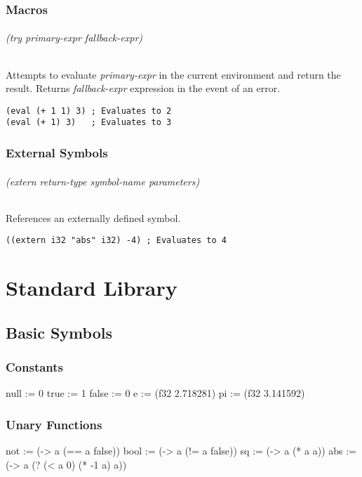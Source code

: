 \documentclass[numbers=noenddot]{scrbook}
\newenvironment{likely}
{ \verbatim }
{ \endverbatim }
\begin{document}
\section{Macros}
\paragraph{(try \emph{primary-expr} \emph{fallback-expr})}
Attempts to evaluate \emph{primary-expr} in the current environment and return the result.
Returns \emph{fallback-expr} expression in the event of an error.

\begin{verbatim}
(eval (+ 1 1) 3) ; Evaluates to 2
(eval (+ 1) 3)   ; Evaluates to 3
\end{verbatim}

\section{External Symbols}
\paragraph{(extern \emph{return-type} \emph{symbol-name} \emph{parameters})}
References an externally defined symbol.

\begin{verbatim}
((extern i32 "abs" i32) -4) ; Evaluates to 4
\end{verbatim}

\part{Standard Library}
\chapter{Basic Symbols}
\section{Constants}
\begin{likely}
null  := 0
true  := 1
false := 0
e  := (f32 2.718281)
pi := (f32 3.141592)
\end{likely}

\section{Unary Functions}
\begin{likely}
not  := (-> a (== a false))
bool := (-> a (!= a false))
sq  := (-> a (* a a))
abs := (-> a (? (< a 0) (* -1 a) a))
\end{likely}
\end{document}
